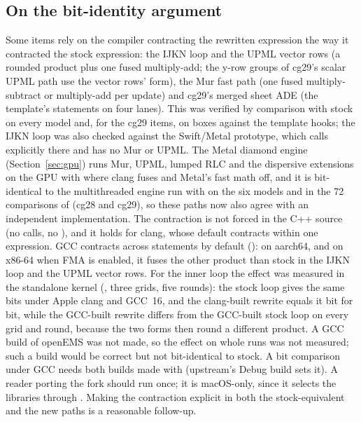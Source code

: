 \subsection{On the bit-identity argument}\label{sec:contract}
Some items rely on the compiler contracting the rewritten expression the way it contracted the stock expression:
the IJKN loop and the UPML vector rows (a rounded product plus one fused multiply-add; the y-row groups of cg29's
scalar UPML path use the vector rows' form), the Mur fast path (one fused multiply-subtract or multiply-add per update)
and cg29's merged sheet ADE (the template's statements on four lanes). This was verified by comparison with stock on
every model and, for the cg29 items, on boxes against the template hooks; the IJKN loop was also checked against the
Swift/Metal prototype, which calls  explicitly there and has no Mur or UPML. The Metal diamond engine
(Section~\ref{sec:gpu}) runs Mur, UPML, lumped RLC and the dispersive extensions on the GPU with  where
clang fuses and Metal's fast math off, and it is bit-identical to the multithreaded engine run with
 on the six models and in the 72 comparisons of  (cg28 and cg29),
so these paths now also agree with an independent implementation. The contraction is not forced in the C++ source (no
 calls, no ), and it holds for clang, whose default contracts within one
expression. GCC contracts across
statements by default (): on aarch64, and on x86-64 when FMA is enabled, it fuses the other
product than stock in the IJKN loop and the UPML vector rows. For the inner loop the effect was measured in the
standalone kernel (, three grids, five rounds): the stock loop
gives the same bits under Apple clang and GCC~16, and the clang-built rewrite equals it bit for bit, while the
GCC-built rewrite differs from the GCC-built stock loop on every grid and round, because the two forms then round a
different product. A GCC build of openEMS was not made, so the effect on whole runs was not measured; such a build
would be correct but not bit-identical to stock. A bit comparison under GCC needs both builds made with
 (upstream's Debug build sets it). A reader porting the fork should run  once;
it is macOS-only, since it selects the libraries through . Making the contraction explicit
in both the stock-equivalent and the new paths is a reasonable follow-up.

